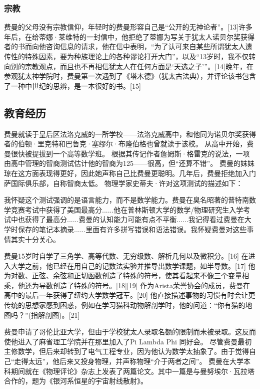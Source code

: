 \subsubsection{宗教}
费曼的父母没有宗教信仰，年轻时的费曼形容自己是“公开的无神论者”。[13]许多年后，在给蒂娜·莱维特的一封信中，他拒绝了蒂娜为写关于犹太人诺贝尔奖获得者的书而向他咨询信息的请求，他在信中表明，“为了认可来自某些所谓犹太人遗传性的特殊因素，要为种族理论上的各种谬论打开大门”，以及“13岁时，我不仅转向别的宗教观点，而且也不再相信犹太人在任何方面是‘天选之子’”。[14]晚年，在参观犹太神学院时，费曼第一次遇到了《塔木德》（犹太古法典），并评论该书包含了一种中世纪的思辨，是一本很好的书。[15]

\subsection{教育经历}
费曼就读于皇后区法洛克威的一所学校——法洛克威高中，和他同为诺贝尔奖获得者的伯顿·里克特和巴鲁克·塞缪尔·布隆伯格也曾就读于该校。 从高中开始，费曼很快被提拔到一个高等数学班。 根据其传记作者詹姆斯·格雷克的说法，一项由高中管理的智商测试估计他的智商为125——很高，但“还算不错”。 费曼的妹妹琼在这方面表现得更好，因此她声称自己比费曼更聪明。几年后，费曼拒绝加入门萨国际俱乐部，自称智商太低。 物理学家史蒂夫·许对这项测试的描述如下：

我怀疑这个测试强调的是语言能力，而不是数学能力。费曼在臭名昭著的普特南数学竞赛考试中获得了美国最高分......他在普林斯顿大学的数学/物理研究生入学考试中也获得了最高分......费曼的认知能力可能有点不平衡......我记得看过费曼在大学时保存的笔记本摘录......里面有许多拼写错误和语法错误。我怀疑费曼对这些事情其实十分关心。

费曼15岁时自学了三角学、高等代数、无穷级数、解析几何以及微积分。[16] 在进入大学之前，他已经在用自己的记数法实验并推导出数学课题，如半导数。[17] 他为对数、正弦、余弦和正切函数创造了特殊的符号，使其看起来不像三个变量相乘，他还为导数创造了特殊的符号。[18][19] 作为Arista荣誉协会的成员，费曼在高中的最后一年获得了纽约大学数学冠军。[20] 他直接描述事物的习惯有时会让更传统的思想家感到困惑，例如在学习猫科动物解剖学时，他的问道：“你有猫的地图吗？”(指解剖图)。[21]

费曼申请了哥伦比亚大学，但由于学校犹太人录取名额的限制而未被录取。这反而使他进入了麻省理工学院并在那里加入了Pi Lambda Phi 同好会。 尽管费曼最初主修数学，但后来却转到了电气工程专业，因为他认为数学太抽象了。由于觉得自己“走得太远”，他后来又投身物理，并声称物理“介于两者之间”。 费曼在大学本科期间就在《物理评论》杂志上发表了两篇论文。其中一篇是与曼努埃尔·瓦拉塔合作的，题为《银河系恒星的宇宙射线散射》。

